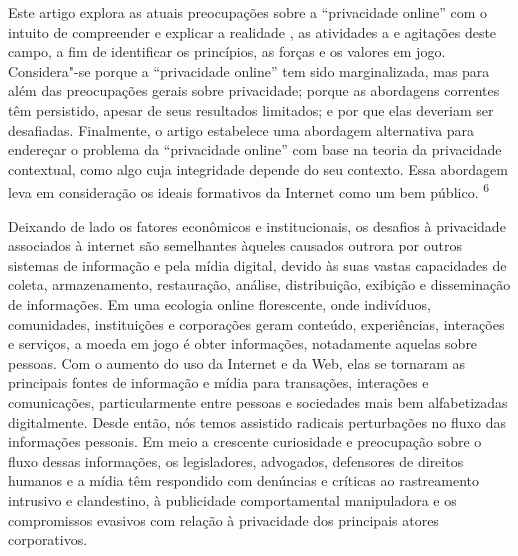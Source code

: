 Este artigo explora as atuais preocupações sobre a ``privacidade
online'' com o intuito de compreender e explicar a realidade , as
atividades a e agitações deste campo, a fim de identificar os
princípios, as forças e os valores em jogo. Considera"-se porque a
``privacidade online'' tem sido marginalizada, mas para além das
preocupações gerais sobre privacidade; porque as abordagens correntes
têm persistido, apesar de seus resultados limitados; e por que elas
deveriam ser desafiadas. Finalmente, o artigo estabelece uma abordagem
alternativa para endereçar o problema da ``privacidade online'' com base
na teoria da privacidade contextual, como algo cuja integridade depende
do seu contexto. Essa abordagem leva em consideração os ideais
formativos da Internet como um bem público. \textsuperscript{{6}}

Deixando de lado os fatores econômicos e institucionais, os desafios à
privacidade associados à internet são semelhantes àqueles causados
outrora por outros sistemas de informação e pela mídia digital, devido
às suas vastas capacidades de coleta, armazenamento, restauração,
análise, distribuição, exibição e disseminação de informações. Em uma
ecologia online florescente, onde indivíduos, comunidades, instituições
e corporações geram conteúdo, experiências, interações e serviços, a
moeda em jogo é obter informações, notadamente aquelas sobre pessoas.
Com o aumento do uso da Internet e da Web, elas se tornaram as
principais fontes de informação e mídia para transações, interações e
comunicações, particularmente entre pessoas e sociedades mais bem
alfabetizadas digitalmente. Desde então, nós temos assistido radicais
perturbações no fluxo das informações pessoais. Em meio a crescente
curiosidade e preocupação sobre o fluxo dessas informações, os
legisladores, advogados, defensores de direitos humanos e a mídia têm
respondido com denúncias e críticas ao rastreamento intrusivo e
clandestino, à publicidade comportamental manipuladora e os compromissos
evasivos com relação à privacidade dos principais atores corporativos.


